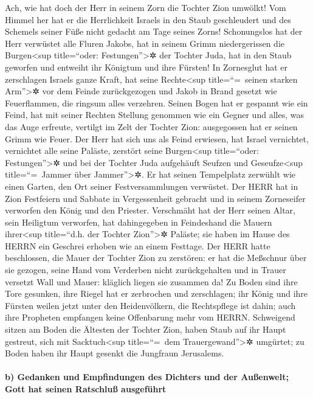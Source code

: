Ach, wie hat doch der Herr in seinem Zorn die Tochter Zion
umwölkt! Vom Himmel her hat er die Herrlichkeit Israels in den Staub
geschleudert und des Schemels seiner Füße nicht gedacht am Tage seines
Zorns! Schonungslos hat der Herr verwüstet alle Fluren
Jakobs, hat in seinem Grimm niedergerissen die Burgen\textless sup
title=``oder: Festungen''\textgreater✲ der Tochter Juda, hat in den
Staub geworfen und entweiht ihr Königtum und ihre Fürsten!
In Zornesglut hat er zerschlagen Israels ganze Kraft, hat
seine Rechte\textless sup title=``=~seinen starken Arm''\textgreater✲
vor dem Feinde zurückgezogen und Jakob in Brand gesetzt wie
Feuerflammen, die ringsum alles verzehren. Seinen Bogen
hat er gespannt wie ein Feind, hat mit seiner Rechten Stellung genommen
wie ein Gegner und alles, was das Auge erfreute, vertilgt im Zelt der
Tochter Zion: ausgegossen hat er seinen Grimm wie Feuer.
Der Herr hat sich uns als Feind erwiesen, hat Israel
vernichtet, vernichtet alle seine Paläste, zerstört seine
Burgen\textless sup title=``oder: Festungen''\textgreater✲ und bei der
Tochter Juda aufgehäuft Seufzen und Geseufze\textless sup
title=``=~Jammer über Jammer''\textgreater✲. Er hat seinen
Tempelplatz zerwühlt wie einen Garten, den Ort seiner Festversammlungen
verwüstet. Der HERR hat in Zion Festfeiern und Sabbate in Vergessenheit
gebracht und in seinem Zorneseifer verworfen den König und den Priester.
Verschmäht hat der Herr seinen Altar, sein Heiligtum
verworfen, hat dahingegeben in Feindeshand die Mauern ihrer\textless sup
title=``d.h. der Tochter Zion''\textgreater✲ Paläste; sie haben im Hause
des HERRN ein Geschrei erhoben wie an einem Festtage. Der
HERR hatte beschlossen, die Mauer der Tochter Zion zu zerstören: er hat
die Meßschnur über sie gezogen, seine Hand vom Verderben nicht
zurückgehalten und in Trauer versetzt Wall und Mauer: kläglich liegen
sie zusammen da! Zu Boden sind ihre Tore gesunken, ihre
Riegel hat er zerbrochen und zerschlagen; ihr König und ihre Fürsten
weilen jetzt unter den Heidenvölkern, die Rechtspflege ist dahin; auch
ihre Propheten empfangen keine Offenbarung mehr vom HERRN.
Schweigend sitzen am Boden die Ältesten der Tochter Zion,
haben Staub auf ihr Haupt gestreut, sich mit Sacktuch\textless sup
title=``=~dem Trauergewand''\textgreater✲ umgürtet; zu Boden haben ihr
Haupt gesenkt die Jungfraun Jerusalems.

\hypertarget{b-gedanken-und-empfindungen-des-dichters-und-der-auuxdfenwelt-gott-hat-seinen-ratschluuxdf-ausgefuxfchrt}{%
\paragraph{b) Gedanken und Empfindungen des Dichters und der Außenwelt;
Gott hat seinen Ratschluß
ausgeführt}\label{b-gedanken-und-empfindungen-des-dichters-und-der-auuxdfenwelt-gott-hat-seinen-ratschluuxdf-ausgefuxfchrt}}

